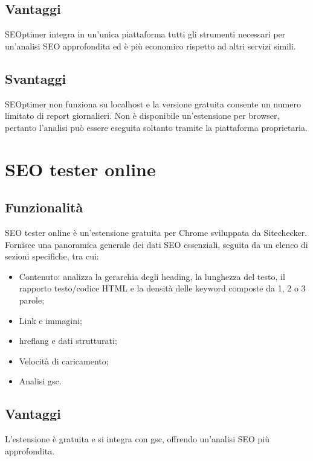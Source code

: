 \subsection{Vantaggi}
\par SEOptimer integra in un'unica piattaforma tutti gli strumenti necessari per un'analisi SEO approfondita ed è più economico rispetto ad altri servizi simili.

\subsection{Svantaggi}
\par SEOptimer non funziona su \gls{localhost} e la versione gratuita consente un numero limitato di report giornalieri. Non è disponibile un'estensione per browser, pertanto l'analisi può essere eseguita soltanto tramite la piattaforma proprietaria.

\section{SEO tester online}

\subsection{Funzionalità}
\par SEO tester online è un'estensione gratuita per Chrome sviluppata da Sitechecker. Fornisce una panoramica generale dei dati SEO essenziali, seguita da un elenco di sezioni specifiche, tra cui:
\begin{itemize}
    \item Contenuto: analizza la gerarchia degli heading, la lunghezza del testo, il rapporto testo/codice HTML e la densità delle keyword composte da 1, 2 o 3 parole;
    \item Link e immagini;
    \item \gls{hreflang} e dati strutturati;
    \item Velocità di caricamento;
    \item Analisi \gls{gsc}.
\end{itemize}

\subsection{Vantaggi}
\par L'estensione è gratuita e si integra con \gls{gsc}, offrendo un'analisi SEO più approfondita.

